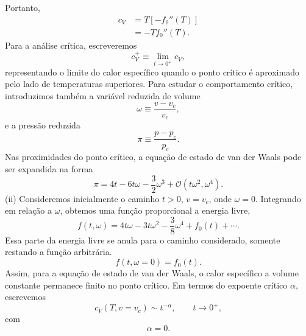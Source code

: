 \documentclass[11pt,a4paper]{article}
\begin{document}
%
Portanto,
%
\begin{align}
    c_V
    &=
    T
    \left[
    -f_0''(T)
    \right]
    \nonumber\\
    &=
    \boxed{
    -T f_0''(T).
    }
    \label{eq:cv_f0_general}
\end{align}
%
Para a análise crítica, escreveremos
%
\begin{equation}
    c_V^+
    \equiv
    \lim_{t\to0^+}c_V,
\end{equation}
%
representando o limite do calor específico quando o ponto crítico é
aproximado pelo lado de temperaturas superiores.
%
Para estudar o comportamento crítico, introduzimos também a variável reduzida de volume
%
\begin{equation}
    \omega
    \equiv
    \frac{v-v_c}{v_c},
    \label{eq:omega_cv}
\end{equation}
%
e a pressão reduzida
%
\begin{equation}
    \pi
    \equiv
    \frac{p-p_c}{p_c}.
    \label{eq:pi_cv}
\end{equation}
%
Nas proximidades do ponto crítico, a equação de estado de van der Waals pode ser expandida na forma
%
\begin{equation}
    \pi
    =
    4t-6t\omega-\frac{3}{2}\omega^3
    +\mathcal{O}(t\omega^2,\omega^4).
    \label{eq:critical_eos_cv}
\end{equation}
% 
(ii) Consideremos inicialmente o caminho    $t>0$, $v=v_c$, onde $\omega=0$. Integrando em relação a $\omega$, obtemos uma função proporcional a energia livre, 
%
\begin{equation}
    f(t,\omega)
    =
    4t\omega
    -3t\omega^2
    -\frac38\omega^4
    + f_0(t)
    +\cdots.
    \label{eq:free_energy_critical}
\end{equation}
%
Essa parte da energia livre se anula para o caminho considerado, somente restando a função arbitrária. 
%
\begin{equation}
    f(t,\omega=0)=f_0(t).
\end{equation}
%
Assim, para a equação de estado de van der Waals, o calor específico
a volume constante permanece finito no ponto crítico. Em termos do
expoente crítico $\alpha$, escrevemos
%
\begin{equation}
    c_V(T,v=v_c)
    \sim
    t^{-\alpha},
    \qquad
    t\to0^+,
\end{equation}
%
com
%
\begin{equation}
    \boxed{\alpha=0}.
    \label{eq:cv_plus}
\end{equation}
\end{document}
